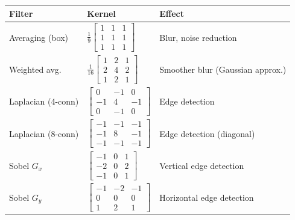 \documentclass[10pt]{article}
\begin{document}

\vspace{0.3cm}
\begin{center}
\begin{tcolorbox}[colback=white, colframe=USC_Congaree, title=\textbf{Quick Reference: Common 3$\times$3 Filters}, sharp corners, colbacktitle=USC_Congaree, coltitle=white]

\begin{tabular}{@{}p{3.5cm}p{4cm}p{6cm}@{}}
\toprule
\textbf{Filter} & \textbf{Kernel} & \textbf{Effect} \\
\midrule
Averaging (box) & $\frac{1}{9}\begin{bmatrix} 1 & 1 & 1 \\ 1 & 1 & 1 \\ 1 & 1 & 1 \end{bmatrix}$ & Blur, noise reduction \\[1.5em]
Weighted avg. & $\frac{1}{16}\begin{bmatrix} 1 & 2 & 1 \\ 2 & 4 & 2 \\ 1 & 2 & 1 \end{bmatrix}$ & Smoother blur (Gaussian approx.) \\[1.5em]
Laplacian (4-conn) & $\begin{bmatrix} 0 & -1 & 0 \\ -1 & 4 & -1 \\ 0 & -1 & 0 \end{bmatrix}$ & Edge detection \\[1.5em]
Laplacian (8-conn) & $\begin{bmatrix} -1 & -1 & -1 \\ -1 & 8 & -1 \\ -1 & -1 & -1 \end{bmatrix}$ & Edge detection (diagonal) \\[1.5em]
Sobel $G_x$ & $\begin{bmatrix} -1 & 0 & 1 \\ -2 & 0 & 2 \\ -1 & 0 & 1 \end{bmatrix}$ & Vertical edge detection \\[1.5em]
Sobel $G_y$ & $\begin{bmatrix} -1 & -2 & -1 \\ 0 & 0 & 0 \\ 1 & 2 & 1 \end{bmatrix}$ & Horizontal edge detection \\[1.5em]

\end{tabular}
\end{tcolorbox}
\end{center}
\end{document}
